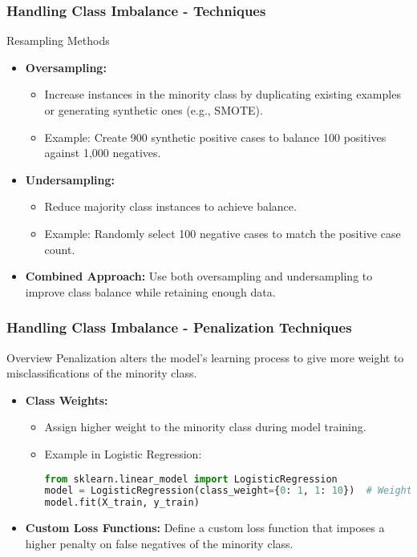 \documentclass[aspectratio=169]{beamer}
\begin{document}
\begin{frame}[fragile]
    \frametitle{Handling Class Imbalance - Techniques}
    \begin{block}{Resampling Methods}
        \begin{itemize}
            \item \textbf{Oversampling:}
            \begin{itemize}
                \item Increase instances in the minority class by duplicating existing examples or generating synthetic ones (e.g., SMOTE).
                \item Example: Create 900 synthetic positive cases to balance 100 positives against 1,000 negatives.
            \end{itemize}
            
            \item \textbf{Undersampling:}
            \begin{itemize}
                \item Reduce majority class instances to achieve balance.
                \item Example: Randomly select 100 negative cases to match the positive case count.
            \end{itemize}
            
            \item \textbf{Combined Approach:} 
            Use both oversampling and undersampling to improve class balance while retaining enough data.
        \end{itemize}
    \end{block}
\end{frame}

\begin{frame}[fragile]
    \frametitle{Handling Class Imbalance - Penalization Techniques}
    \begin{block}{Overview}
        Penalization alters the model's learning process to give more weight to misclassifications of the minority class.
    \end{block}
    \begin{itemize}
        \item \textbf{Class Weights:}
        \begin{itemize}
            \item Assign higher weight to the minority class during model training.
            \item Example in Logistic Regression:
            \begin{lstlisting}[language=Python]
from sklearn.linear_model import LogisticRegression
model = LogisticRegression(class_weight={0: 1, 1: 10})  # Weighting minority class more heavily
model.fit(X_train, y_train)
            \end{lstlisting}
        \end{itemize}
        
        \item \textbf{Custom Loss Functions:} 
        Define a custom loss function that imposes a higher penalty on false negatives of the minority class.
    \end{itemize}
\end{frame}
\end{document}
